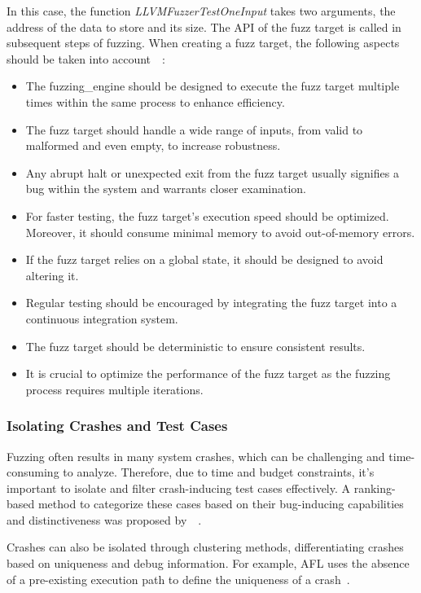 In this case, the function \textit{LLVMFuzzerTestOneInput} takes two arguments,
the address of the data to store and its size. The API of the fuzz target is
called in subsequent steps of fuzzing. When creating a fuzz target, the
following aspects should be taken into account~\cite{libFuzze17:online}~\cite{257204}:

\begin{itemize}
\item The \gls{fuzzing_engine} should be designed to execute the fuzz target
multiple times within the same process to enhance efficiency.
\item The fuzz target should handle a wide range of inputs, from valid to
malformed and even empty, to increase robustness.
\item Any abrupt halt or unexpected exit from the fuzz target usually
signifies a bug within the system and warrants closer examination.
\item For faster testing, the fuzz target's execution speed should be
optimized. Moreover, it should consume minimal memory to avoid out-of-memory errors.
\item If the fuzz target relies on a global state, it should be
designed to avoid altering it.
\item Regular testing should be encouraged by integrating the fuzz
target into a continuous integration system.
\item The fuzz target should be deterministic to ensure consistent results.
\item It is crucial to optimize the performance of the fuzz target as the
fuzzing process requires multiple iterations.
\end{itemize}

\subsubsection{Isolating Crashes and Test Cases}
Fuzzing often results in many system crashes, which can be challenging and
time-consuming to analyze. Therefore, due to time and budget constraints, it's
important to isolate and filter crash-inducing test cases effectively. A
ranking-based method to categorize these cases based on their bug-inducing
capabilities and distinctiveness was proposed by~~\cite{chen2013taming}.

Crashes can also be isolated through clustering methods, differentiating
crashes based on uniqueness and debug information. For example, AFL uses the absence
of a pre-existing execution path to define the uniqueness of a crash~\cite{GitHubgo92:online}.

